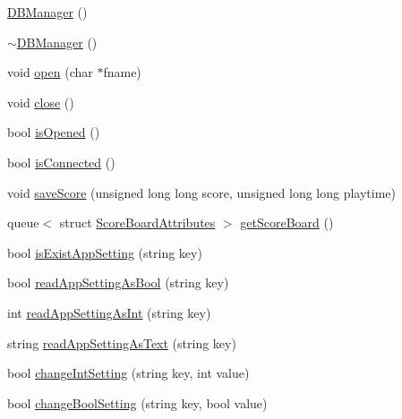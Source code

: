 \begin{DoxyCompactItemize}
\item 
\hyperlink{class_tetris_1_1_d_b_management_1_1_d_b_manager_a8271c37f255a2e2bc85a3e1896a32c43}{D\+B\+Manager} ()
\item 
\hyperlink{class_tetris_1_1_d_b_management_1_1_d_b_manager_ac22f39981d5c862ad17b7420e313f1b2}{$\sim$\+D\+B\+Manager} ()
\item 
void \hyperlink{class_tetris_1_1_d_b_management_1_1_d_b_manager_a8bf7e756a9cca7e57fef00076fb62f36}{open} (char $\ast$fname)
\item 
void \hyperlink{class_tetris_1_1_d_b_management_1_1_d_b_manager_a8390e6ddf3fa06e90fa5c2ab4997e5c1}{close} ()
\item 
bool \hyperlink{class_tetris_1_1_d_b_management_1_1_d_b_manager_a16460066d64c9183a63194177bb0458e}{is\+Opened} ()
\item 
bool \hyperlink{class_tetris_1_1_d_b_management_1_1_d_b_manager_a62043d50855f42b69b057527b14dec0f}{is\+Connected} ()
\item 
void \hyperlink{class_tetris_1_1_d_b_management_1_1_d_b_manager_aef16da1d2e564caa309bfc3b3e419d7e}{save\+Score} (unsigned long long score, unsigned long long playtime)
\item 
queue$<$ struct \hyperlink{struct_tetris_1_1_d_b_management_1_1_score_board_attributes}{Score\+Board\+Attributes} $>$ \hyperlink{class_tetris_1_1_d_b_management_1_1_d_b_manager_aa67ef286408b2631e15e9f8f41937c97}{get\+Score\+Board} ()
\item 
bool \hyperlink{class_tetris_1_1_d_b_management_1_1_d_b_manager_aa80722572c33389c1c73f88de9f199b6}{is\+Exist\+App\+Setting} (string key)
\item 
bool \hyperlink{class_tetris_1_1_d_b_management_1_1_d_b_manager_a598b8014fcad434b5b1162cc6767d22c}{read\+App\+Setting\+As\+Bool} (string key)
\item 
int \hyperlink{class_tetris_1_1_d_b_management_1_1_d_b_manager_ac52daf6ea2310b848278454c30698436}{read\+App\+Setting\+As\+Int} (string key)
\item 
string \hyperlink{class_tetris_1_1_d_b_management_1_1_d_b_manager_acb213c517f06d1eadafd45a86b91c2ff}{read\+App\+Setting\+As\+Text} (string key)
\item 
bool \hyperlink{class_tetris_1_1_d_b_management_1_1_d_b_manager_aead8bb3f2a64fdf6ac59c69bfd21a01e}{change\+Int\+Setting} (string key, int value)
\item 
bool \hyperlink{class_tetris_1_1_d_b_management_1_1_d_b_manager_aece3390d5f2edca3f86316b903870c92}{change\+Bool\+Setting} (string key, bool value)
\end{DoxyCompactItemize}
